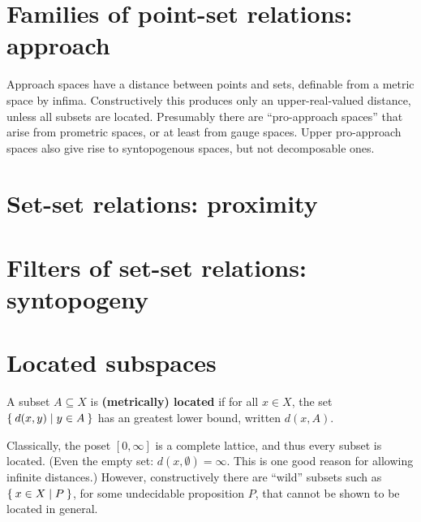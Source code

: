 \documentclass{article}
\def\Rp{[0,\infty]}
\begin{document}


\section{Families of point-set relations: approach}
\label{sec:approach}

Approach spaces have a distance between points and sets, definable from a metric space by infima.
Constructively this produces only an upper-real-valued distance, unless all subsets are located.
Presumably there are ``pro-approach spaces'' that arise from prometric spaces, or at least from gauge spaces.
Upper pro-approach spaces also give rise to syntopogenous spaces, but not decomposable ones.


\section{Set-set relations: proximity}
\label{sec:set-set}
\label{sec:proximity}



\section{Filters of set-set relations: syntopogeny}
\label{sec:syntop}



\section{Located subspaces}
\label{sec:located}

\begin{defn}
  A subset $A\subseteq X$ is \textbf{(metrically) located} if for all $x\in X$, the set $\Set{ d(x,y) | y\in A }$ has an greatest lower bound, written $d(x,A)$.
\end{defn}

Classically, the poset $\Rp$ is a complete lattice, and thus every subset is located.
(Even the empty set: $d(x,\emptyset)=\infty$.
This is one good reason for allowing infinite distances.)
However, constructively there are ``wild'' subsets such as $\Set{x\in X | P}$, for some undecidable proposition $P$, that cannot be shown to be located in general.




\end{document}
